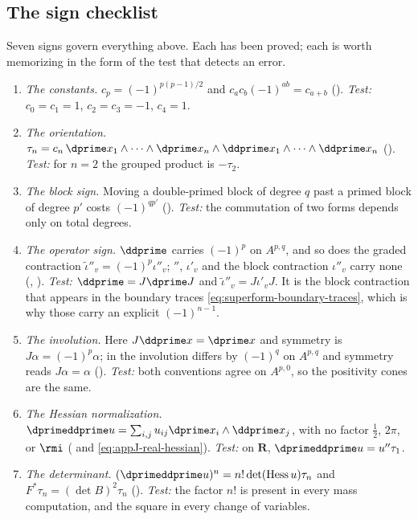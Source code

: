 \subsection{The sign checklist}

Seven signs govern everything above.  Each has been proved; each is worth
memorizing in the form of the test that detects an error.

\begin{enumerate}
\item \emph{The constants.}  $c_p=(-1)^{p(p-1)/2}$ and
  $c_ac_b(-1)^{ab}=c_{a+b}$
  ().  \emph{Test:} $c_0=c_1=1$, $c_2=c_3=-1$,
  $c_4=1$.
\item \emph{The orientation.}
  $\tau_n=c_n\,\dprime x_1\wedge\cdots\wedge\dprime x_n\wedge
   \ddprime x_1\wedge\cdots\wedge\ddprime x_n$
  ().  \emph{Test:} for $n=2$ the grouped product
  is $-\tau_2$.
\item \emph{The block sign.}  Moving a double-primed block of degree $q$
  past a primed block of degree $p'$ costs $(-1)^{qp'}$
  ().  \emph{Test:} the commutation of two
  forms depends only on total degrees.
\item \emph{The operator sign.}  $\ddprime$ carries $(-1)^p$ on $A^{p,q}$,
  and so does the graded contraction $\widetilde\iota''_v=(-1)^p\iota''_v$;
  $\dprime$, $\iota'_v$ and the block contraction $\iota''_v$ carry none
  (, ).  \emph{Test:}
  $\ddprime=J\dprime J$ and $\widetilde\iota''_v=J\iota'_vJ$.  It is the
  block contraction that appears in the boundary traces
  \eqref{eq:superform-boundary-traces}, which is why those carry an explicit
  $(-1)^{n-1}$.
\item \emph{The involution.}  Here $J\ddprime x=\dprime x$ and symmetry is
  $J\alpha=(-1)^p\alpha$; in \cite{CLD25} the involution differs by
  $(-1)^q$ on $A^{p,q}$ and symmetry reads $J\alpha=\alpha$
  ().  \emph{Test:} both conventions agree on
  $A^{p,0}$, so the positivity cones are the same.
\item \emph{The Hessian normalization.}
  $\dprimeddprime u=\sum_{i,j}u_{ij}\dprime x_i\wedge\ddprime x_j$, with no
  factor $\tfrac12$, $2\pi$, or $\rmi$
  ( and \eqref{eq:appJ-real-hessian}).
  \emph{Test:} on $\mathbf R$, $\dprimeddprime u=u''\tau_1$.
\item \emph{The determinant.}  $(\dprimeddprime u)^n=n!\det(\operatorname{Hess}u)\tau_n$
  and $F^*\tau_n=(\det B)^2\tau_n$
  ().  \emph{Test:}
  the factor $n!$ is present in every mass computation, and the square in
  every change of variables.
\end{enumerate}

